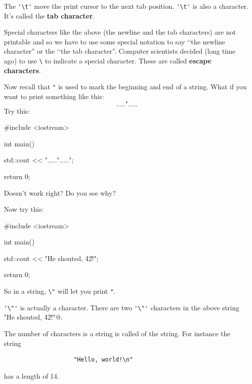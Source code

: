 The \verb!'\t'! move the print cursor to the next tab position. 
\verb!'\t'! is also a character. 
It's called the \textbf{tab character}.

Special characters like the above (the newline and the tab characters) are not printable and so we have to use some special notation to say 
\lq\lq the newline character'' or the 
\lq\lq the tab character''. 
Computer scientists decided (long time ago) to use 
\verb!\! to indicate a special character. 
These are called \textbf{escape characters}.

Now recall that \verb!"! is used to mark the beginning and end of a string. What if you want to print something like this:
\[
	\texttt{.....".....}
\]
Try this:
\begin{console}
#include <iostream>

int main()
{
    std::cout << ".....".....";

    return 0;
}
\end{console}
Doesn't work right? Do you see why?

Now try this:
\begin{console}
#include <iostream>

int main()
{
    std::cout << "He shouted, \"42!\"\n";

    return 0;
}
\end{console}

So in a string, \verb!\"! will let you print \verb!"!. 

\verb!'\"'! is actually a character. 
There are two \verb!'\"'! characters in the above string  
\verb@"He shouted, \"42!\"\n"@.


















The number of characters is a string is called 
of the string. For instance the string 
\begin{verbatim}
                    "Hello, world!\n"
\end{verbatim}
has a length of 14. 


